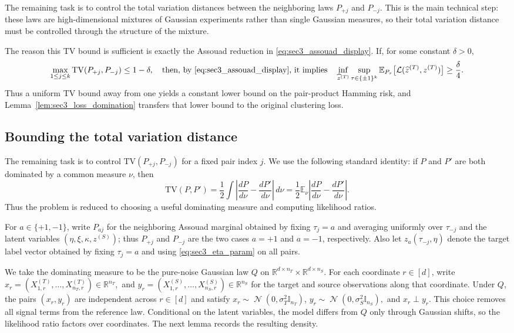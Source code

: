 \documentclass[10pt]{article}
\newcommand{\R}{\mathbb R}
\newcommand{\Ebb}{\mathbb E}
\newcommand{\Id}{\mathbb I}
\newcommand{\wh}{\widehat}
\newcommand{\calL}{\mathcal L}
\newcommand{\TV}{\mathrm{TV}}
\DeclareMathOperator{\dnorm}{\mathcal N}
\newcommand{\trg}{T}
\newcommand{\nT}{n_{\trg}}
\newcommand{\sigmaT}{\sigma_{\trg}}
\newcommand{\Xtar}{X^{(\trg)}}
\newcommand{\ztar}{z^{(\trg)}}
\newcommand{\hatztar}{\wh{z}^{(\trg)}}
\newcommand{\src}{S}
\newcommand{\nS}{n_{\src}}
\newcommand{\sigmaS}{\sigma_{\src}}
\newcommand{\Xsrc}{X^{(\src)}}
\newcommand{\zsrc}{z^{(\src)}}
\begin{document}
The remaining task is to control the total variation distances between
the neighboring laws $P_{+j}$ and $P_{-j}$. This is the main technical step:
these laws are high-dimensional mixtures of Gaussian experiments rather than
single Gaussian measures, so their total variation distance must be controlled
through the structure of the mixture.

The reason this TV bound is sufficient is exactly the Assouad reduction in
\eqref{eq:sec3_assouad_display}. If, for some constant $\delta>0$,
\[
    \max_{1\le j\le k}\TV(P_{+j},P_{-j})\le 1-\delta,\quad\mbox{then, by \eqref{eq:sec3_assouad_display}, it implies}\quad
    \inf_{\hatztar}\sup_{\tau\in\{\pm1\}^k}
    \Ebb_{P_\tau}\bigl[\calL(\hatztar,\ztar)\bigr]
    \ge \frac{\delta}{4}.
\]
Thus a uniform TV bound away from one yields a constant lower bound on the
pair-product Hamming risk, and Lemma~\ref{lem:sec3_loss_domination} transfers
that lower bound to the original clustering loss.

\subsection{Bounding the total variation distance}
The remaining task is to control $\TV(P_{+j},P_{-j})$ for a fixed pair
index $j$. We use the following standard identity: if $P$ and $P'$ are both
dominated by a common measure $\nu$, then
\begin{equation}
    \label{eq:tv-density-identity}
    \TV(P,P')
    =
    \frac12\int\left|\frac{dP}{d\nu}-\frac{dP'}{d\nu}\right|\,d\nu
    =
    \frac12\Ebb_{\nu}\left|
    \frac{dP}{d\nu}-\frac{dP'}{d\nu}
    \right|.
\end{equation}
Thus the problem is reduced to choosing a useful dominating measure and
computing likelihood ratios.

For $a\in\{+1,-1\}$, write $P_{aj}$ for the neighboring Assouad marginal
obtained by fixing $\tau_j=a$ and averaging uniformly over
$\tau_{-j}$ and the latent variables $(\eta,\xi,\kappa,\zsrc)$; thus
$P_{+j}$ and $P_{-j}$ are the two cases $a=+1$ and $a=-1$, respectively.
Also let $z_a(\tau_{-j},\eta)$ denote the target label vector obtained by
fixing $\tau_j=a$ and using \eqref{eq:sec3_eta_param} on all pairs.

We take the dominating measure to be the pure-noise Gaussian law $Q$ on
$\R^{d\times \nT}\times\R^{d\times \nS}$. For each coordinate $r\in[d]$, write $x_r=(\Xtar_{1,r},\ldots,\Xtar_{\nT,r})\in\R^{\nT},$ and $y_r=(\Xsrc_{1,r},\ldots,\Xsrc_{\nS,r})\in\R^{\nS}$
for the target and source observations along that coordinate. Under $Q$, the
pairs $(x_r,y_r)$ are independent across $r\in[d]$ and satisfy $x_r\sim\dnorm(0,\sigmaT^2 \Id_{\nT})$, $y_r\sim\dnorm(0,\sigmaS^2 \Id_{\nS}),$ and $x_r\perp y_r.$
This choice removes all signal terms from the reference law. Conditional on the latent variables, the model differs from $Q$ only through Gaussian shifts, so the likelihood ratio factors over coordinates. The next lemma records the
resulting density.
\end{document}

